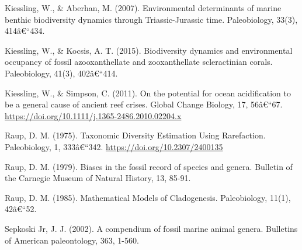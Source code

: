 \documentclass[]{article}
\begin{document}
Kiessling, W., \& Aberhan, M. (2007). Environmental determinants of
marine benthic biodiversity dynamics through Triassic-Jurassic time.
Paleobiology, 33(3), 414â€``434.

Kiessling, W., \& Kocsis, A. T. (2015). Biodiversity dynamics and
environmental occupancy of fossil azooxanthellate and zooxanthellate
scleractinian corals. Paleobiology, 41(3), 402â€``414.

Kiessling, W., \& Simpson, C. (2011). On the potential for ocean
acidification to be a general cause of ancient reef crises. Global
Change Biology, 17, 56â€``67.
\url{https://doi.org/10.1111/j.1365-2486.2010.02204.x}

Raup, D. M. (1975). Taxonomic Diversity Estimation Using Rarefaction.
Paleobiology, 1, 333â€``342. \url{https://doi.org/10.2307/2400135}

Raup, D. M. (1979). Biases in the fossil record of species and genera.
Bulletin of the Carnegie Museum of Natural History, 13, 85-91.

Raup, D. M. (1985). Mathematical Models of Cladogenesis. Paleobiology,
11(1), 42â€``52.

Sepkoski Jr, J. J. (2002). A compendium of fossil marine animal genera.
Bulletins of American paleontology, 363, 1-560.
\end{document}
